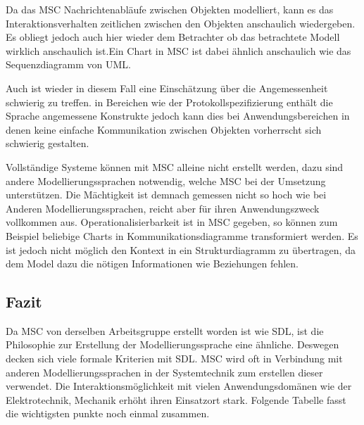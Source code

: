 Da das \ac{MSC} Nachrichtenabläufe zwischen Objekten modelliert, kann es das Interaktionsverhalten zeitlichen zwischen den Objekten anschaulich wiedergeben. Es obliegt jedoch auch hier wieder dem Betrachter ob das betrachtete Modell wirklich anschaulich ist.Ein Chart in \ac{MSC} ist dabei ähnlich anschaulich wie das Sequenzdiagramm von UML.

Auch ist wieder in diesem Fall eine Einschätzung über die Angemessenheit schwierig zu treffen. in Bereichen wie der Protokollspezifizierung enthält die Sprache angemessene Konstrukte jedoch kann dies bei Anwendungsbereichen in denen keine einfache Kommunikation zwischen Objekten vorherrscht sich schwierig gestalten.

Vollständige Systeme können mit \ac{MSC} alleine nicht erstellt werden, dazu sind andere Modellierungssprachen notwendig, welche \ac{MSC} bei der Umsetzung unterstützen. Die Mächtigkeit ist demnach gemessen nicht so hoch wie bei Anderen  Modellierungssprachen, reicht aber für ihren Anwendungszweck vollkommen aus.
Operationalisierbarkeit ist in \ac{MSC} gegeben, so können zum Beispiel beliebige Charts in Kommunikationsdiagramme transformiert werden. Es ist jedoch nicht möglich den Kontext in ein  Strukturdiagramm zu übertragen, da dem Model dazu die nötigen Informationen wie  Beziehungen fehlen.


\subsection{Fazit}
\label{sc:MSCFazit}
Da \ac{MSC} von derselben Arbeitsgruppe erstellt worden ist wie \ac{SDL}, ist die Philosophie zur Erstellung der Modellierungssprache eine ähnliche. Deswegen decken sich viele formale Kriterien mit \ac{SDL}. \ac{MSC} wird oft in Verbindung mit anderen Modellierungssprachen in der Systemtechnik zum erstellen dieser verwendet. Die Interaktionsmöglichkeit mit vielen Anwendungsdomänen wie der Elektrotechnik, Mechanik erhöht ihren Einsatzort stark. Folgende Tabelle fasst die wichtigsten punkte noch einmal zusammen.

